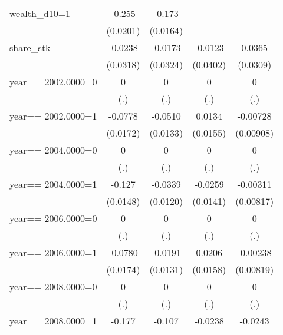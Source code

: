 \begin{table}[htbp]
\begin{tabular}{l*{4}{c}}
\addlinespace
wealth\_d10=1    &   -0.255\sym{***}&   -0.173\sym{***}&                  &                  \\
                & (0.0201)         & (0.0164)         &                  &                  \\
\addlinespace
share\_stk       &  -0.0238         &  -0.0173         &  -0.0123         &   0.0365         \\
                & (0.0318)         & (0.0324)         & (0.0402)         & (0.0309)         \\
\addlinespace
year==  2002.0000=0&        0         &        0         &        0         &        0         \\
                &      (.)         &      (.)         &      (.)         &      (.)         \\
\addlinespace
year==  2002.0000=1&  -0.0778\sym{***}&  -0.0510\sym{***}&   0.0134         & -0.00728         \\
                & (0.0172)         & (0.0133)         & (0.0155)         &(0.00908)         \\
\addlinespace
year==  2004.0000=0&        0         &        0         &        0         &        0         \\
                &      (.)         &      (.)         &      (.)         &      (.)         \\
\addlinespace
year==  2004.0000=1&   -0.127\sym{***}&  -0.0339\sym{***}&  -0.0259\sym{*}  & -0.00311         \\
                & (0.0148)         & (0.0120)         & (0.0141)         &(0.00817)         \\
\addlinespace
year==  2006.0000=0&        0         &        0         &        0         &        0         \\
                &      (.)         &      (.)         &      (.)         &      (.)         \\
\addlinespace
year==  2006.0000=1&  -0.0780\sym{***}&  -0.0191         &   0.0206         & -0.00238         \\
                & (0.0174)         & (0.0131)         & (0.0158)         &(0.00819)         \\
\addlinespace
year==  2008.0000=0&        0         &        0         &        0         &        0         \\
                &      (.)         &      (.)         &      (.)         &      (.)         \\
\addlinespace
year==  2008.0000=1&   -0.177\sym{***}&   -0.107\sym{***}&  -0.0238\sym{*}  &  -0.0243\sym{***}\\

\end{tabular}
\end{table}
